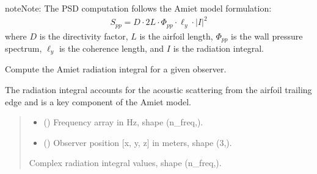 \documentclass[letterpaper,10pt,english]{sphinxmanual}
\begin{document}
\begin{fulllineitems}
\begin{fulllineitems}
\begin{sphinxadmonition}{note}{Note:}
\sphinxAtStartPar
The PSD computation follows the Amiet model formulation:
\begin{equation*}
\begin{split}S_{pp} = D \cdot 2L \cdot \Phi_{pp} \cdot \ell_y \cdot |I|^2\end{split}
\end{equation*}
\sphinxAtStartPar
where \(D\) is the directivity factor, \(L\) is the airfoil length,
\(\Phi_{pp}\) is the wall pressure spectrum, \(\ell_y\) is the coherence length,
and \(I\) is the radiation integral.
\end{sphinxadmonition}

\end{fulllineitems}


\begin{fulllineitems}
\label{\detokenize{amiet_model:amiet_self_noise.amiet_model.AmietModel.compute_radiation_integral}}
\pysigstartsignatures
\pysiglinewithargsret
{}
{\sphinxparamcomma {}}
{}
\pysigstopsignatures
\sphinxAtStartPar
Compute the Amiet radiation integral for a given observer.

\sphinxAtStartPar
The radiation integral accounts for the acoustic scattering
from the airfoil trailing edge and is a key component of
the Amiet model.
\begin{quote}\begin{description}
\begin{itemize}
\item {} 
\sphinxAtStartPar
{} () \textendash{} Frequency array in Hz, shape (n\_freq,).

\item {} 
\sphinxAtStartPar
{} () \textendash{} Observer position {[}x, y, z{]} in meters, shape (3,).

\end{itemize}

\sphinxAtStartPar
{} \textendash{} Complex radiation integral values, shape (n\_freq,).


\end{description}
\end{quote}
\end{fulllineitems}
\end{fulllineitems}
\end{document}
